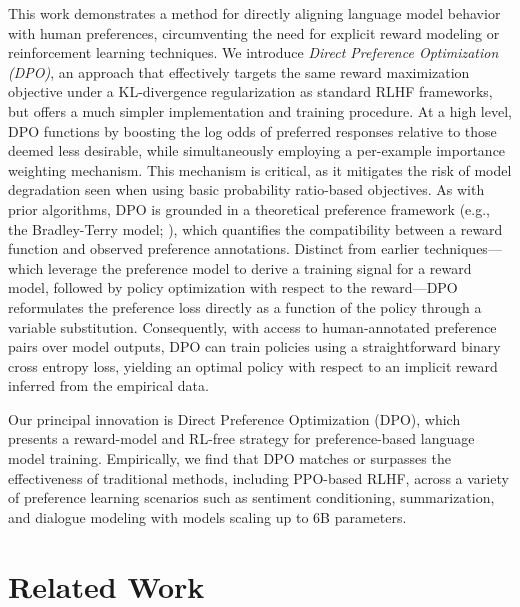 This work demonstrates a method for directly aligning language model behavior with human preferences, circumventing the need for explicit reward modeling or reinforcement learning techniques. We introduce \textit{{Direct Preference Optimization} (DPO)}, an approach that effectively targets the same reward maximization objective under a KL-divergence regularization as standard RLHF frameworks, but offers a much simpler implementation and training procedure. At a high level, DPO functions by boosting the log odds of preferred responses relative to those deemed less desirable, while simultaneously employing a per-example importance weighting mechanism. This mechanism is critical, as it mitigates the risk of model degradation seen when using basic probability ratio-based objectives. As with prior algorithms, DPO is grounded in a theoretical preference framework (e.g., the Bradley-Terry model; \cite{bradley1952rankanalysis}), which quantifies the compatibility between a reward function and observed preference annotations. Distinct from earlier techniques—which leverage the preference model to derive a training signal for a reward model, followed by policy optimization with respect to the reward—DPO reformulates the preference loss directly as a function of the policy through a variable substitution. Consequently, with access to human-annotated preference pairs over model outputs, DPO can train policies using a straightforward binary cross entropy loss, yielding an optimal policy with respect to an implicit reward inferred from the empirical data.

Our principal innovation is Direct Preference Optimization (DPO), which presents a reward-model and RL-free strategy for preference-based language model training. Empirically, we find that DPO matches or surpasses the effectiveness of traditional methods, including PPO-based RLHF, across a variety of preference learning scenarios such as sentiment conditioning, summarization, and dialogue modeling with models scaling up to 6B parameters.

\section{Related Work}

